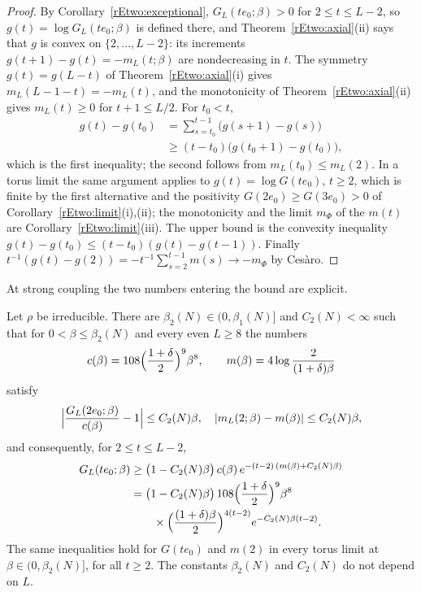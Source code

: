 \begin{proof}
By Corollary~\ref{rEtwo:exceptional}, $G_L(te_0;\beta)>0$ for $2\le t\le
L-2$, so $g(t)=\log G_L(te_0;\beta)$ is defined there, and
Theorem~\ref{rEtwo:axial}(ii) says that $g$ is convex on $\{2,\dots,L-2\}$:
its increments $g(t+1)-g(t)=-m_L(t;\beta)$ are nondecreasing in $t$. The
symmetry $g(t)=g(L-t)$ of Theorem~\ref{rEtwo:axial}(i) gives $m_L(L-1-t)=
-m_L(t)$, and the monotonicity of Theorem~\ref{rEtwo:axial}(ii) gives
$m_L(t)\ge0$ for $t+1\le L/2$. For $t_0<t$,
\begin{align*}
g(t)-g(t_0)&=\sum_{s=t_0}^{t-1}\bigl(g(s+1)-g(s)\bigr)\\
&\ge(t-t_0)\bigl(g(t_0+1)-g(t_0)\bigr),
\end{align*}
which is the first inequality; the second follows from $m_L(t_0)\le
m_L(2)$. In a torus limit the same argument applies to $g(t)=\log G(te_0)$,
$t\ge2$, which is finite by the first alternative and the positivity
$G(2e_0)\ge G(3e_0)>0$ of Corollary~\ref{rEtwo:limit}(i),(ii); the
monotonicity and the limit $m_\Phi$ of the $m(t)$ are
Corollary~\ref{rEtwo:limit}(iii). The upper bound is the convexity
inequality $g(t)-g(t_0)\le(t-t_0)(g(t)-g(t-1))$. Finally $t^{-1}(g(t)-g(2))
=-t^{-1}\sum_{s=2}^{t-1}m(s)\to-m_\Phi$ by Ces\`aro.
\end{proof}

At strong coupling the two numbers entering the bound are explicit.

\begin{theorem}\label{rEtwo:strong}
Let $\rho$ be irreducible. There are $\beta_2(N)\in(0,\beta_1(N)]$ and
$C_2(N)<\infty$ such that for $0<\beta\le\beta_2(N)$ and every even
$L\ge8$ the numbers
\[
c(\beta)=108\Bigl(\frac{1+\delta}2\Bigr)^{9}\beta^8,\qquad
m(\beta)=4\log\frac2{(1+\delta)\beta}
\]
satisfy
\[
\Bigl|\frac{G_L(2e_0;\beta)}{c(\beta)}-1\Bigr|\le C_2(N)\beta,\quad
|m_L(2;\beta)-m(\beta)|\le C_2(N)\beta ,
\]
and consequently, for $2\le t\le L-2$,
\begin{align*}
G_L(te_0;\beta)&\ge\bigl(1-C_2(N)\beta\bigr)\,c(\beta)\,
e^{-(t-2)\,(m(\beta)+C_2(N)\beta)}\\
&=\bigl(1-C_2(N)\beta\bigr)\,108\Bigl(\frac{1+\delta}2\Bigr)^{9}\beta^{8}\\
&\qquad\times\Bigl(\frac{(1+\delta)\beta}{2}\Bigr)^{4(t-2)}e^{-C_2(N)\beta(t-2)} .
\end{align*}
The same inequalities hold for $G(te_0)$ and $m(2)$ in every torus limit
at $\beta\in(0,\beta_2(N)]$, for all $t\ge2$. The constants $\beta_2(N)$
and $C_2(N)$ do not depend on $L$.
\end{theorem}


